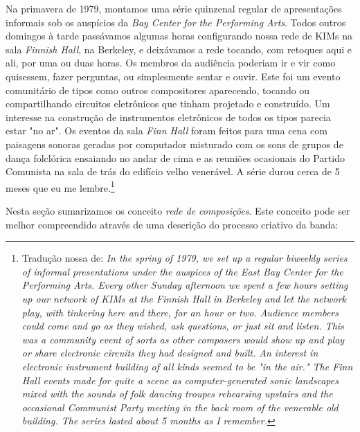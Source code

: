 \begin{citacao}
Na primavera de 1979, montamos uma série quinzenal regular de apresentações informais sob os auspícios da \emph{Bay Center for the Performing Arts}. Todos outros domingos à tarde passávamos algumas horas configurando nossa rede de KIMs na sala \emph{Finnish Hall}, na Berkeley, e deixávamos a rede tocando, com retoques aqui e ali, por uma ou duas horas. Os membros da audiência poderiam ir e vir como quisessem, fazer perguntas, ou simplesmente sentar e ouvir. Este foi um evento comunitário de tipos como outros compositores aparecendo, tocando ou compartilhando circuitos eletrônicos que tinham projetado e construído. Um interesse na construção de instrumentos eletrônicos de todos os tipos parecia estar "no ar". Os eventos da sala \emph{Finn Hall} foram feitos para uma cena com paisagens sonoras geradas por computador misturado com os sons de grupos de dança folclórica ensaiando no andar de cima e as reuniões ocasionais do Partido Comunista na sala de trás do edifício velho venerável. A série durou cerca de 5 meses que eu me lembre.\cite[online]{brown_indigenous_2013}\footnote{Tradução nossa de: \emph{In the spring of 1979, we set up a regular biweekly series of informal presentations under the auspices of the East Bay Center for the Performing Arts. Every other Sunday afternoon we spent a few hours setting up our network of KIMs at the Finnish Hall in Berkeley and let the network play, with tinkering here and there, for an hour or two. Audience members could come and go as they wished, ask questions, or just sit and listen. This was a community event of sorts as other composers would show up and play or share electronic circuits they had designed and built. An interest in electronic instrument building of all kinds seemed to be "in the air." The Finn Hall events made for quite a scene as computer-generated sonic landscapes mixed with the sounds of folk dancing troupes rehearsing upstairs and the occasional Communist Party meeting in the back room of the venerable old building. The series lasted about 5 months as I remember.}}
\end{citacao}

Nesta seção sumarizamos os conceito \emph{rede de composições}. Este conceito pode ser melhor compreendido através de uma descrição do processo criativo da banda:

